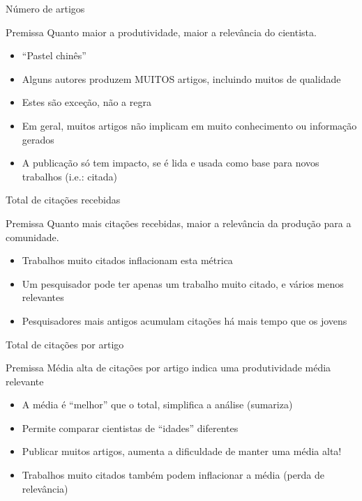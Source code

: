 \documentclass{beamer}
\begin{document}
\begin{frame}{Número de artigos}
  \begin{block}{Premissa}
    Quanto maior a produtividade, maior a relevância do cientista.
  \end{block}
  \begin{itemize}
  \item ``Pastel chinês''
  \item Alguns autores produzem MUITOS artigos, incluindo muitos de qualidade
  \item Estes são exceção, não a regra
  \item Em geral, muitos artigos não implicam em muito conhecimento ou informação gerados
  \item A publicação só tem impacto, se é lida e usada como base para novos trabalhos (i.e.: \alert{citada})
  \end{itemize}
\end{frame}

\begin{frame}{Total de citações recebidas}
  \begin{block}{Premissa}
    Quanto mais citações recebidas, maior a relevância da produção para a comunidade.
  \end{block}
  \begin{itemize}
  \item Trabalhos muito citados inflacionam esta métrica
  \item Um pesquisador pode ter apenas um trabalho muito citado, e vários menos relevantes
  \item Pesquisadores mais antigos acumulam citações há mais tempo que os jovens
  \end{itemize}
\end{frame}

\begin{frame}{Total de citações por artigo}
  \begin{block}{Premissa}
    Média alta de citações por artigo indica uma produtividade média relevante
  \end{block}
  \begin{itemize}
  \item A média é ``melhor'' que o total, simplifica a análise (sumariza)
  \item Permite comparar cientistas de ``idades'' diferentes
  \item Publicar muitos artigos, aumenta a dificuldade de manter uma média alta!
  \item Trabalhos muito citados também podem inflacionar a média (perda de relevância)
  \end{itemize}
\end{frame}
\end{document}

